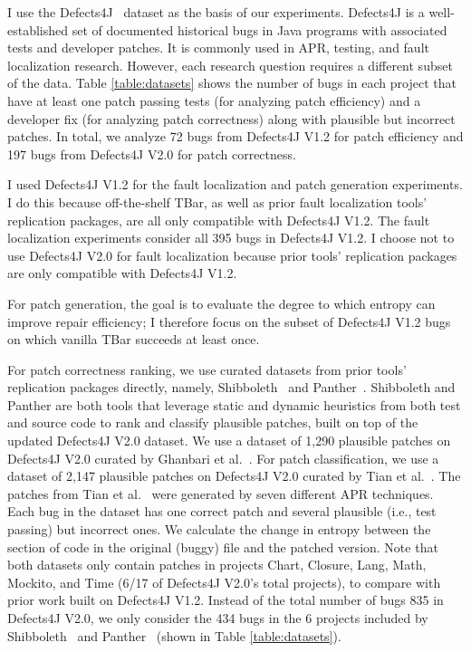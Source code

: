 \documentclass[12pt,openany,oneside,table]{cmuthesis}
\begin{document}
I use the Defects4J~\cite{just2014defects4j} dataset as the basis of our
experiments.  Defects4J is a well-established set of documented historical bugs in Java
programs with associated tests and developer patches. It is commonly used in
APR, testing, and fault localization research. However, each research question requires a different subset of the
data. Table \ref{table:datasets} shows the number of bugs in each project that
have at least one patch passing tests (for analyzing patch efficiency) and a
developer fix (for analyzing patch correctness) along with plausible but
incorrect patches. In total, we analyze 72 bugs from Defects4J V1.2 for patch
efficiency and 197 bugs from Defects4J V2.0 for patch correctness.

I used Defects4J V1.2 for the fault localization and patch generation experiments. 
I do this because off-the-shelf TBar, as well as prior fault localization tools' replication packages, are all only compatible with Defects4J V1.2. The fault localization experiments consider all 395 bugs in Defects4J V1.2.  
I choose not to use Defects4J V2.0 for fault localization because prior tools' replication packages are only compatible with Defects4J V1.2. 

For patch generation, the goal is to evaluate the degree to which entropy can improve repair efficiency; I therefore focus on the subset of Defects4J V1.2 bugs on which vanilla TBar succeeds at least once.

For patch correctness ranking, we use curated datasets from prior tools'
replication packages directly, namely, Shibboleth~\cite{Shibboleth} and
Panther~\cite{Panther}. Shibboleth and Panther are both tools that leverage
static and dynamic heuristics from both test and source code to rank and
classify plausible patches, built on top of the updated Defects4J V2.0 dataset. We
use a dataset of 1,290 plausible patches on Defects4J V2.0 curated by Ghanbari et
al.~\cite{Shibboleth}. For patch classification, we use a dataset of 2,147
plausible patches on Defects4J V2.0 curated by Tian et al.~\cite{Panther}. The
patches from Tian et al.~\cite{Panther} were generated by seven different APR
techniques. Each bug in the dataset has one correct patch and several plausible
(i.e., test passing) but incorrect ones. We calculate the change in entropy
between the section of code in the original (buggy) file and the patched
version. Note that both datasets only contain patches in projects Chart, Closure, Lang, Math, Mockito, and Time (6/17 of Defects4J V2.0's total projects), to compare with prior work built on Defects4J V1.2. Instead of the total number of bugs 835 in Defects4J V2.0, we only consider the 434 bugs in the 6 projects included by Shibboleth~\cite{Shibboleth} and
Panther~\cite{Panther} (shown in Table \ref{table:datasets}).
\end{document}
